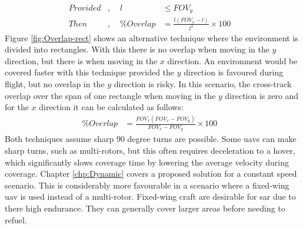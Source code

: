\begin{equation}
	\label{eqn:overlap_sqr}
	\begin{aligned}
		Provided&,& ~~l &\leq FOV_y& \\
		Then&,& ~~\%Overlap &= \frac{l(FOV_x - l)}{l^2} \times 100&
	\end{aligned}
\end{equation}
Figure \ref{fig:Overlap-rect} shows an alternative technique where the environment is divided into rectangles. With this there is no overlap when moving in the $y$ direction, but there is when moving in the $x$ direction. An environment would be covered faster with this technique provided the $y$ direction is favoured during flight, but no overlap in the $y$ direction is risky. In this scenario, the cross-track overlap over the span of one rectangle when moving in the $y$ direction is zero and for the $x$ direction it can be calculated as follows:
\begin{equation}
	\label{eqn:overlap_rect}
	\begin{aligned}
		\%Overlap &= \frac{FOV_x(FOV_x-FOV_y)}{FOV_x-FOV_y} \times 100&
	\end{aligned}
\end{equation}
Both techniques assume sharp 90 degree turns are possible. Some \acsp{uav} can make sharp turns, such as multi-rotors, but this often requires deceleration to a hover, which significantly slows coverage time by lowering the average velocity during coverage. Chapter \ref{chp:Dynamic} covers a proposed solution for a constant speed scenario. This is considerably more favourable in a scenario where a fixed-wing \acs{uav} is used instead of a multi-rotor. Fixed-wing craft are desirable for \acs{sar} due to there high endurance. They can generally cover larger areas before needing to refuel.\\

